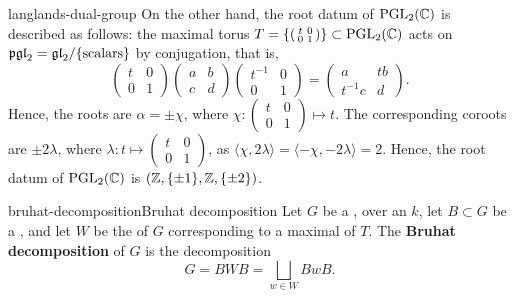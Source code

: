 \begin{example}{langlands-dual-group}
    On the other hand, the root datum of $\textup{PGL}_2(\mathbb{C})$ is described as follows: the maximal torus $T = \left\{ \left( \begin{smallmatrix} t & 0 \\ 0 & 1 \end{smallmatrix} \right) \right\} \subset \textup{PGL}_2(\mathbb{C})$ acts on $\mathfrak{pgl}_2 = \mathfrak{gl}_2 / \{ \textup{scalars} \}$ by conjugation, that is,
    \[ \begin{pmatrix} t & 0 \\ 0 & 1 \end{pmatrix} \begin{pmatrix} a & b \\ c & d \end{pmatrix} \begin{pmatrix} t^{-1} & 0 \\ 0 & 1 \end{pmatrix} = \begin{pmatrix} a & t b \\ t^{-1} c & d \end{pmatrix} . \]
    Hence, the roots are $\alpha = \pm \chi$, where $\chi : \left( \begin{smallmatrix} t & 0 \\ 0 & 1 \end{smallmatrix} \right) \mapsto t$. The corresponding coroots are $\pm 2 \lambda$, where $\lambda : t \mapsto \left( \begin{smallmatrix} t & 0 \\ 0 & 1 \end{smallmatrix} \right)$, as $\langle \chi, 2 \lambda \rangle = \langle - \chi, - 2 \lambda \rangle = 2$. Hence, the root datum of $\textup{PGL}_2(\mathbb{C})$ is $(\mathbb{Z}, \{ \pm 1 \}, \mathbb{Z}, \{ \pm 2 \})$.
\end{example}

\begin{topic}{bruhat-decomposition}{Bruhat decomposition}
    Let $G$ be a ,   over an  $k$, let $B \subset G$ be a , and let $W$ be the  of $G$ corresponding to a maximal  of $T$. The \textbf{Bruhat decomposition} of $G$ is the decomposition
    \[ G = BWB = \bigsqcup_{w \in W} BwB . \]
\end{topic}

